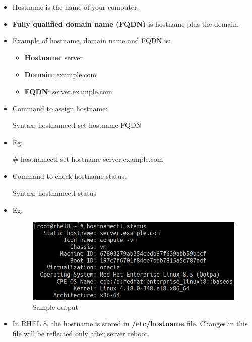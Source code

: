 \setlength{\columnsep}{3pt}
\begin{flushleft}
\bigskip


\begin{itemize}
	\item Hostname is the name of your computer.
	
	\item \textbf{Fully qualified domain name (FQDN)} is hostname plus the domain.
	
	\item Example of hostname, domain name and FQDN is:
	\begin{itemize}
		\item \textbf{Hostname}: server
		\item \textbf{Domain}: example.com
		\item \textbf{FQDN}: server.example.com
	\end{itemize}
	\bigskip
	\item Command to assign hostname:
	\begin{tcolorbox}[breakable,notitle,boxrule=-0pt,colback=pink,colframe=pink]
		\color{black}
		\font=9pt
		Syntax: hostnamectl set-hostname FQDN
		\font=4pt
	\end{tcolorbox}
	\bigskip
	\item Eg:
	\begin{tcolorbox}[breakable,notitle,boxrule=-0pt,colback=black,colframe=black]
		\color{green}
		\font=9pt
		\# hostnamectl set-hostname server.example.com
		\font=4pt
	\end{tcolorbox}

	\item Command to check hostname status:
	\begin{tcolorbox}[breakable,notitle,boxrule=-0pt,colback=pink,colframe=pink]
		\color{black}
		\font=9pt
		Syntax: hostnamectl status
		\font=4pt
	\end{tcolorbox}
	\bigskip
	\item Eg:
	\begin{figure}[h!]
		\centering
		\includegraphics[scale=.35]{content/chapter14/images/hostname.png}
		\caption{Sample output}
		\label{fig:hoststatus}
	\end{figure}		

	\bigskip
	\item In RHEL 8, the hostname is stored in \textbf{/etc/hostname} file. Changes in this file will be reflected only after server reboot.
	
	

\end{itemize}



\end{flushleft}
\newpage


